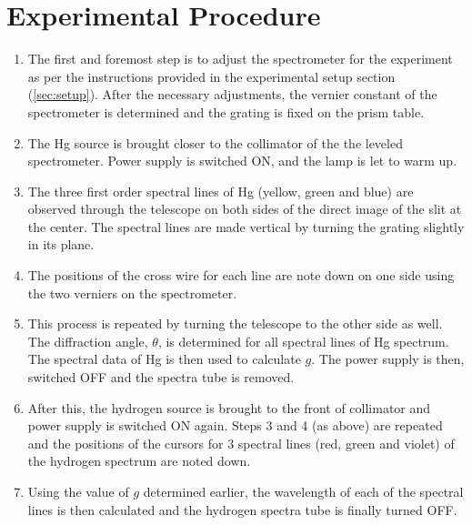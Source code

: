 \documentclass[%
 reprint,
 amsmath,amssymb,
 aps,
]{revtex4-2}
\begin{document}
\section{Experimental Procedure}
    \begin{enumerate}
        \item The first and foremost step is to adjust the spectrometer for the experiment as per the instructions provided in the experimental setup section (\ref{sec:setup}). After the necessary adjustments, the vernier constant of the spectrometer is determined and the grating is fixed on the prism table.
        \item The Hg source is brought closer to the collimator of the the leveled spectrometer. Power supply is switched ON, and the lamp is let to warm up.
        \item  The three first order spectral lines of Hg (yellow, green and blue) are observed through the telescope on both sides of the direct image of the slit at the center. The spectral lines are made vertical by turning the grating slightly in its plane.
        \item The positions of the cross wire for each line are note down on one side using the two verniers on the spectrometer.
        \item This process is repeated by turning the telescope to the other side as well. The diffraction angle, $\theta$, is determined for all spectral lines of Hg spectrum. The spectral data of Hg is then used to calculate $g$. The power supply is then, switched OFF and the spectra tube is removed.
        \item After this, the hydrogen source is brought to the front of collimator and power supply is switched ON again. Steps 3 and 4 (as above) are repeated and the positions of the cursors for 3 spectral lines (red, green and violet) of the hydrogen spectrum are noted down.
        \item Using the value of $g$ determined earlier, the wavelength of each of the spectral lines is then calculated and the hydrogen spectra tube is finally turned OFF.
    \end{enumerate}
    
    
\end{document}
